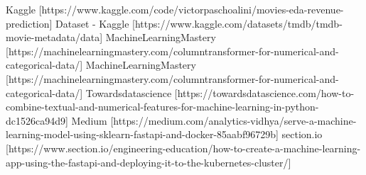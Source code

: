 \documentclass[conference]{IEEEtran}
\begin{document}
\begin{thebibliography}{00}
 Kaggle [https://www.kaggle.com/code/victorpaschoalini/movies-eda-revenue-prediction]
 Dataset - Kaggle [https://www.kaggle.com/datasets/tmdb/tmdb-movie-metadata/data]
 MachineLearningMastery [https://machinelearningmastery.com/columntransformer-for-numerical-and-categorical-data/]
 MachineLearningMastery [https://machinelearningmastery.com/columntransformer-for-numerical-and-categorical-data/]
 Towardsdatascience [https://towardsdatascience.com/how-to-combine-textual-and-numerical-features-for-machine-learning-in-python-dc1526ca94d9]
 Medium [https://medium.com/analytics-vidhya/serve-a-machine-learning-model-using-sklearn-fastapi-and-docker-85aabf96729b]
 section.io [https://www.section.io/engineering-education/how-to-create-a-machine-learning-app-using-the-fastapi-and-deploying-it-to-the-kubernetes-cluster/]
\end{thebibliography}
\end{document}
